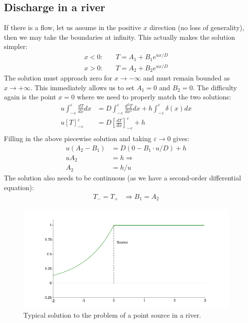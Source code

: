 \documentclass[onecolumn]{article}
\begin{document}
\subsection*{Discharge in a river}
\label{dischargeRiver}
If there is a flow, let us assume in the positive $x$ direction (no loss of generality), then we may take
the boundaries at infinity. This actually makes the solution simpler:
%
\begin{align}
          x < 0: & \quad T = A_1 + B_1 e^{u x / D} \\
\nonumber x > 0: & \quad T = A_2 + B_2 e^{u x / D}
\end{align}
The solution must approach zero for $x \rightarrow -\infty$ and must remain bounded as $x \rightarrow +\infty$.
This immediately allows us to set $A_1 = 0$ and $B_2 = 0$. The difficulty again is the point $x = 0$ where
we need to properly match the two solutions:
%
\begin{align}
          u \int_{-\varepsilon}^{\varepsilon} \frac{d T}{d x} dx & =
              D \int_{-\varepsilon}^{\varepsilon} \frac{d^2 T}{d x^2} dx + h \int_{-\varepsilon}^{\varepsilon} \delta(x) dx \\
\nonumber u [T]_{-\varepsilon}^{\varepsilon} & =
              D [\frac{d T}{d x}]_{-\varepsilon}^{\varepsilon} + h \\
\end{align}
Filling in the above piecewise solution and taking $\varepsilon \rightarrow 0$ gives:
%
\begin{align}
          u (A_2 - B_1) & =
              D (0 - B_1 \cdot u/D) + h \\
\nonumber u A_2 & = h \Rightarrow \\
            A_2 & = h/u
\end{align}
The solution also needs to be continuous (as we have a second-order differential equation):
%
\begin{align}
          T_- = T_+ & \Rightarrow B_1 = A_2
\end{align}

\begin{figure}
\begin{center}
\includegraphics{river.pdf}
\caption{Typical solution to the problem of a point source in a river.}
\label{figureRiver}
\end{center}
\end{figure}
\end{document}
